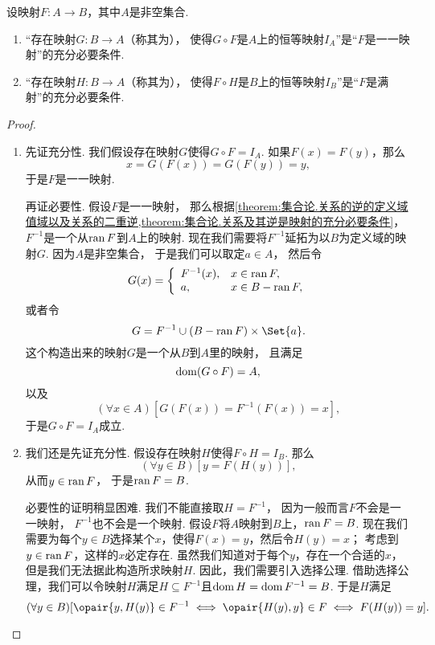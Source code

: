 \begin{theorem}
设映射\(F\colon A \to B\)，其中\(A\)是非空集合.
\begin{enumerate}
	\item “存在映射\(G\colon B \to A\)（称其为），
	使得\(G \circ F\)是\(A\)上的恒等映射\(I_A\)”是“\(F\)是一一映射”的充分必要条件.

	\item “存在映射\(H\colon B \to A\)（称其为），
	使得\(F \circ H\)是\(B\)上的恒等映射\(I_B\)”是“\(F\)是满射”的充分必要条件.
\end{enumerate}
\begin{proof}
\begin{enumerate}
	\item
	先证充分性.
	我们假设存在映射\(G\)使得\(G \circ F = I_A\).
	如果\(F(x) = F(y)\)，那么\[
		x = G(F(x)) = G(F(y)) = y,
	\]
	于是\(F\)是一一映射.

	再证必要性.
	假设\(F\)是一一映射，
	那么根据\cref{theorem:集合论.关系的逆的定义域值域以及关系的二重逆,theorem:集合论.关系及其逆是映射的充分必要条件}，
	\(F^{-1}\)是一个从\(\operatorname{ran} F\)到\(A\)上的映射.
	现在我们需要将\(F^{-1}\)延拓为以\(B\)为定义域的映射\(G\).
	因为\(A\)是非空集合，
	于是我们可以取定\(a \in A\)，
	然后令\[
		G(x) = \left\{ \begin{array}{ll}
			F^{-1}(x), & x \in \operatorname{ran} F, \\
			a, & x \in B - \operatorname{ran} F,
		\end{array} \right.
	\]或者令\[
		G = F^{-1} \cup (B - \ran F) \times \Set{a}.
	\]
	这个构造出来的映射\(G\)是一个从\(B\)到\(A\)里的映射，
	且满足\[
		\operatorname{dom}(G \circ F) = A,
	\]
	以及\[
		(\forall x \in A)[G(F(x)) = F^{-1}(F(x)) = x],
	\]
	于是\(G \circ F = I_A\)成立.

	\item
	我们还是先证充分性.
	假设存在映射\(H\)使得\(F \circ H = I_B\).
	那么\[
		(\forall y \in B)[y = F(H(y))],
	\]
	从而\(y \in \operatorname{ran} F\)，
	于是\(\operatorname{ran} F = B\).

	必要性的证明稍显困难.
	我们不能直接取\(H = F^{-1}\)，
	因为一般而言\(F\)不会是一一映射，
	\(F^{-1}\)也不会是一个映射.
	假设\(F\)将\(A\)映射到\(B\)上，\(\operatorname{ran} F = B\).
	现在我们需要为每个\(y \in B\)选择某个\(x\)，使得\(F(x) = y\)，然后令\(H(y) = x\)；
	考虑到\(y \in \operatorname{ran} F\)，这样的\(x\)必定存在.
	虽然我们知道对于每个\(y\)，存在一个合适的\(x\)，
	但是我们无法据此构造所求映射\(H\).
	因此，我们需要引入选择公理.
	借助选择公理，我们可以令映射\(H\)满足\(H \subseteq F^{-1}\)且\(\operatorname{dom} H = \operatorname{dom} F^{-1} = B\).
	于是\(H\)满足\[
		(\forall y \in B)
		[
			\opair{y,H(y)} \in F^{-1}
			\iff
			\opair{H(y),y} \in F
			\iff
			F(H(y)) = y
		].
		\qedhere
	\]
\end{enumerate}
\end{proof}
\end{theorem}

